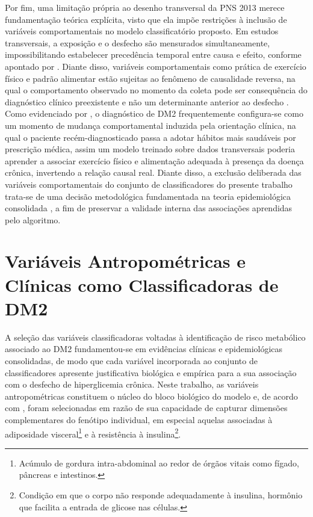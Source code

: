 Por fim, uma limitação própria ao desenho transversal da PNS 2013 merece fundamentação teórica explícita, visto que ela impõe restrições à inclusão de variáveis comportamentais no modelo classificatório proposto. Em estudos transversais, a exposição e o desfecho são mensurados simultaneamente, impossibilitando estabelecer precedência temporal entre causa e efeito, conforme apontado por \textcite{rothman2008modern}. Diante disso, variáveis comportamentais como prática de exercício físico e padrão alimentar estão sujeitas ao fenômeno de causalidade reversa, na qual o comportamento observado no momento da coleta pode ser consequência do diagnóstico clínico preexistente e não um determinante anterior ao desfecho \cite{rothman2008modern,dimova2020diagnosis}. Como evidenciado por \textcite{dimova2020diagnosis}, o diagnóstico de DM2 frequentemente configura-se como um momento de mudança comportamental induzida pela orientação clínica, na qual o paciente recém-diagnosticado passa a adotar hábitos mais saudáveis por prescrição médica, assim um modelo treinado sobre dados transversais poderia aprender a associar exercício físico e alimentação adequada à presença da doença crônica, invertendo a relação causal real. Diante disso, a exclusão deliberada das variáveis comportamentais do conjunto de classificadores do presente trabalho trata-se de uma decisão metodológica fundamentada na teoria epidemiológica consolidada \cite{rothman2008modern}, a fim de preservar a validade interna das associações aprendidas pelo algoritmo.

\section{Variáveis Antropométricas e Clínicas como Classificadoras de DM2}\label{sec:variaveis}

A seleção das variáveis classificadoras voltadas à identificação de risco metabólico associado ao DM2 fundamentou-se em evidências clínicas e epidemiológicas consolidadas, de modo que cada variável incorporada ao conjunto de classificadores apresente justificativa biológica e empírica para a sua associação com o desfecho de hiperglicemia crônica. Neste trabalho, as variáveis antropométricas constituem o núcleo do bloco biológico do modelo e, de acordo com \textcite{mlynarska2025type}, foram selecionadas em razão de sua capacidade de capturar dimensões complementares do fenótipo individual, em especial aquelas associadas à adiposidade visceral\footnote{Acúmulo de gordura intra-abdominal ao redor de órgãos vitais como fígado, pâncreas e intestinos.} e à resistência à insulina\footnote{Condição em que o corpo não responde adequadamente à insulina, hormônio que facilita a entrada de glicose nas células.}.

